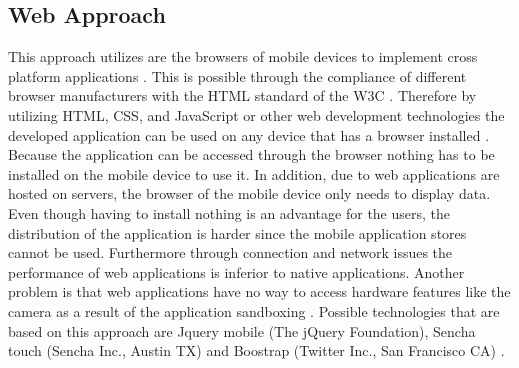 \documentclass[Bachelor,BIF,english]{twbook}
\begin{document}
\subsection{Web Approach}
This approach utilizes are the browsers of mobile devices to implement cross platform applications \cite[p.~2]{7934674}. This is possible through the compliance of different browser manufacturers with the HTML standard of the W3C \cite[p.~2]{LinckArne2016}. Therefore by utilizing HTML, CSS, and JavaScript or other web development technologies the developed application can be used on any device that has a browser installed \cite[p.~2]{7934674}.
\\[\baselineskip]
Because the application can be accessed through the browser nothing has to be installed on the mobile device to use it. In addition, due to web applications are hosted on servers, the browser of the mobile device only needs to display data. Even though having to install nothing is an advantage for the users, the distribution of the application is harder since the mobile application stores cannot be used. Furthermore through connection and network issues the performance of web applications is inferior to native applications. Another problem is that web applications have no way to access hardware features like the camera as a result of the application sandboxing \cite[p.~626]{6420693}. Possible technologies that are based on this approach are Jquery mobile (The jQuery Foundation), Sencha touch (Sencha Inc., Austin TX) and Boostrap (Twitter Inc., San Francisco CA) \cite[p.~2]{7934674}.
\end{document}
